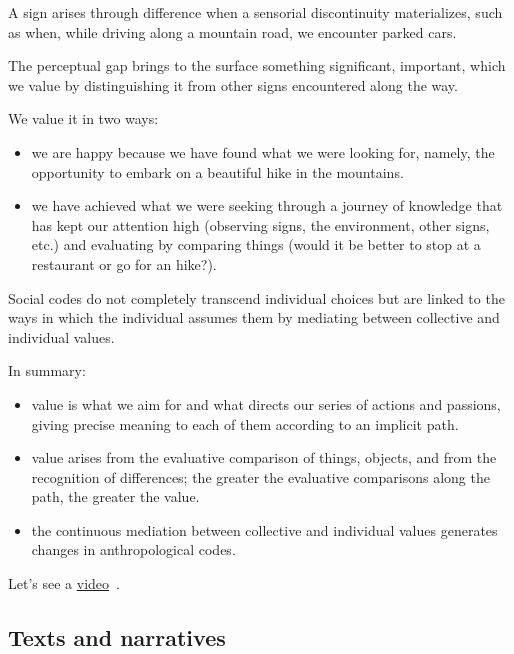 A sign arises through difference when a sensorial discontinuity materializes, such as when, while driving along a mountain road, we encounter parked cars.

The perceptual gap brings to the surface something significant, important, which we value by distinguishing it from other signs encountered along the way.

We value it in two ways:

\begin{itemize}
\tightlist\item we are happy because we have found what we were looking for, namely, the opportunity to embark on a beautiful hike in the mountains.
\item we have achieved what we were seeking through a journey of knowledge that has kept our attention high (observing signs, the environment, other signs, etc.) and evaluating by comparing things (would it be better to stop at a restaurant or go for an hike?).
\end{itemize}

Social codes do not completely transcend individual choices but are linked to the ways in which the individual assumes them by mediating between collective and individual values.

In summary:

\begin{itemize}
\tightlist\item value is what we aim for and what directs our series of actions and passions, giving precise meaning to each of them according to an implicit path.
\item value arises from the evaluative comparison of things, objects, and from the recognition of differences; the greater the evaluative comparisons along the path, the greater the value.
\item the continuous mediation between collective and individual values \hspace{0pt}\hspace{0pt}generates changes in anthropological codes.
\end{itemize}

Let's see a \href{http://www.musicaecodice.it/on_server/media/1_media/sordi1.mp4}{video}~\cite{sordi}.

\subsection{Texts and narratives}\label{texts-and-narratives}

